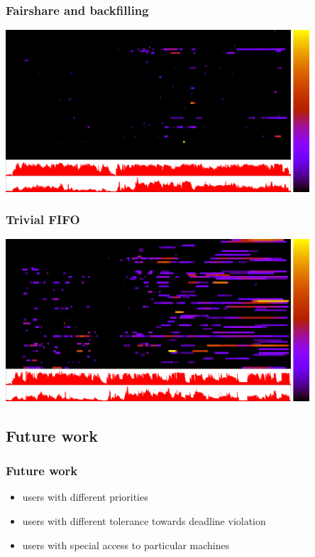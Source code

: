 \begin{frame}
	\frametitle{Fairshare and backfilling}
	\begin{center}
	\includegraphics[width=0.85\textwidth]{max_backfill.png}
	\end{center}
\end{frame}

\begin{frame}
	\frametitle{Trivial FIFO}
	\begin{center}
	\includegraphics[width=0.85\textwidth]{none_fifo.png}
	\end{center}
\end{frame}

\subsection{Future work}

\begin{frame}
	\frametitle{Future work}
	\begin{itemize}
		\item users with different priorities \pause
		\item users with different tolerance towards deadline violation \pause
		\item users with special access to particular machines
	\end{itemize}
\end{frame}

